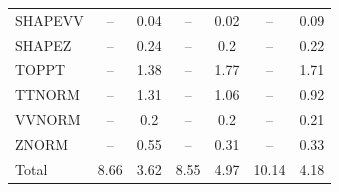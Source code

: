 \begin{table}[H]
\begin{center}
\begin{footnotesize}
\begin{tabular}{lcccccc}
				SHAPEVV & -- &  0.04 & -- &  0.02 & -- &  0.09 \\
				SHAPEZ & -- &  0.24 & -- &  0.2 & -- &  0.22 \\
				TOPPT & -- &  1.38 & -- &  1.77 & -- &  1.71 \\
				TTNORM & -- &  1.31 & -- &  1.06 & -- &  0.92 \\
				VVNORM & -- &  0.2 & -- &  0.2 & -- &  0.21 \\
				ZNORM & -- &  0.55 & -- &  0.31 & -- &  0.33 \\
				Total &  8.66  &  3.62 &  8.55  &  4.97 &  10.14  &  4.18 \\ \hline \hline
			\end{tabular}
			\label{tab:SysUncertainties_400}
        \end{footnotesize}
	\end{center}
\end{table}


